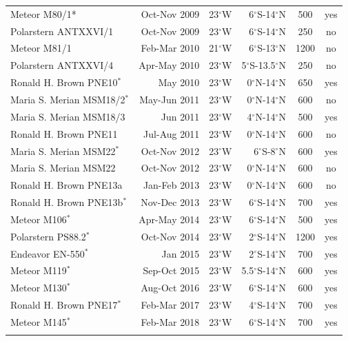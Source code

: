\documentclass[os, manuscript]{copernicus}
\begin{document}
\begin{table}[t]
\begin{tabular}{lrcrcc}
			Meteor M80/1* & Oct-Nov 2009 & 23$^{\circ}$W & 6$^{\circ}$S-14$^{\circ}$N & 500 & yes  \\
			Polarstern ANTXXVI/1 & Oct-Nov 2009 & 23$^{\circ}$W & 6$^{\circ}$S-14$^{\circ}$N & 250 & no \\
			Meteor M81/1 & Feb-Mar 2010 & 21$^{\circ}$W & 6$^{\circ}$S-13$^{\circ}$N & 1200 & no  \\
			Polarstern ANTXXVI/4 & Apr-May 2010 & 23$^{\circ}$W & 5$^{\circ}$S-13.5$^{\circ}$N & 250 & no\\
			Ronald H. Brown PNE10$ ^{*} $ & May 2010 & 23$^{\circ}$W & 0$^{\circ}$N-14$^{\circ}$N & 650 & yes  \\
			Maria S. Merian MSM18/2$ ^{*} $ & May-Jun 2011 & 23$^{\circ}$W & 0$^{\circ}$N-14$^{\circ}$N & 600 & no  \\
			Maria S. Merian MSM18/3 & Jun 2011 & 23$^{\circ}$W & 4$^{\circ}$N-14$^{\circ}$N & 500 & yes \\
			Ronald H. Brown PNE11 & Jul-Aug 2011 & 23$^{\circ}$W & 0$^{\circ}$N-14$^{\circ}$N & 600 & no  \\
			Maria S. Merian MSM22$ ^{*} $ & Oct-Nov 2012 & 23$^{\circ}$W & 6$^{\circ}$S-8$^{\circ}$N & 600 & yes  \\
			Maria S. Merian MSM22 & Oct-Nov 2012 & 23$^{\circ}$W & 0$^{\circ}$N-14$^{\circ}$N & 600 & no \\
			Ronald H. Brown PNE13a & Jan-Feb 2013 & 23$^{\circ}$W & 0$^{\circ}$N-14$^{\circ}$N & 600 & no  \\
			Ronald H. Brown PNE13b$ ^{*} $ & Nov-Dec 2013 & 23$^{\circ}$W & 6$^{\circ}$S-14$^{\circ}$N & 700 & yes  \\
			Meteor M106$ ^{*} $ & Apr-May 2014 & 23$^{\circ}$W & 6$^{\circ}$S-14$^{\circ}$N & 500 & yes  \\
			Polarstern PS88.2$ ^{*} $ & Oct-Nov 2014 & 23$^{\circ}$W & 2$^{\circ}$S-14$^{\circ}$N & 1200 & yes  \\ 
			Endeavor EN-550$ ^{*} $ & Jan 2015 & 23$^{\circ}$W & 2$^{\circ}$S-14$^{\circ}$N & 700 & yes \\
			Meteor M119$ ^{*} $ & Sep-Oct 2015 & 23$^{\circ}$W & 5.5$^{\circ}$S-14$^{\circ}$N & 600 & yes  \\
			Meteor M130$ ^{*} $ & Aug-Oct 2016 & 23$^{\circ}$W & 6$^{\circ}$S-14$^{\circ}$N & 600 & yes  \\
			Ronald H. Brown PNE17$ ^{*} $ & Feb-Mar 2017 & 23$^{\circ}$W & 4$^{\circ}$S-14$^{\circ}$N & 700 & yes \\
			Meteor M145$ ^{*} $ & Feb-Mar 2018 & 23$^{\circ}$W & 6$^{\circ}$S-14$^{\circ}$N & 700 & yes \\
			\bottomhline
		\end{tabular}
		\label{tab_cruises}
	\end{table}
\end{document}
